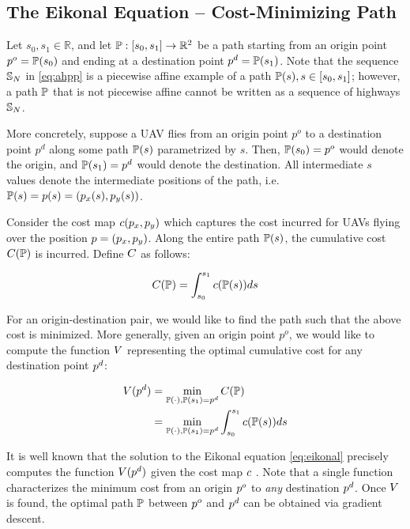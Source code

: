 \subsection{The Eikonal Equation -- Cost-Minimizing Path}
Let $s_0, s_1\in \mathbb{R}$, and let $\mathbb{P}: [s_0, s_1] \rightarrow \mathbb{R}^2$ be a path starting from an origin point $p^o = \mathbb{P}(s_0)$ and ending at a destination point $p^d = \mathbb{P}(s_1)$. Note that the sequence $\mathbb{S}_N$ in \eqref{eq:ahpp} is a piecewise affine example of a path $\mathbb{P}(s), s\in[s_0, s_1]$; however, a path $\mathbb{P}$ that is not piecewise affine cannot be written as a sequence of highways $\mathbb{S}_N$.

More concretely, suppose a UAV flies from an origin point $p^o$ to a destination point $p^d$ along some path $\mathbb{P}(s)$ parametrized by $s$. Then, $\mathbb{P}(s_0) = p^o$ would denote the origin, and $\mathbb{P}(s_1) = p^d$ would denote the destination. All intermediate $s$ values denote the intermediate positions of the path, i.e. $\mathbb{P}(s) = p(s) = (p_x(s), p_y(s))$.

Consider the cost map $c(p_x, p_y)$ which captures the cost incurred for UAVs flying over the position $p = (p_x, p_y)$. Along the entire path $\mathbb{P}(s)$, the cumulative cost $C(\mathbb{P})$ is incurred. Define $C$ as follows:

\begin{equation}
C(\mathbb{P}) = \int_{s_0}^{s_1} c(\mathbb{P}(s)) ds
\end{equation}

For an origin-destination pair, we would like to find the path such that the above cost is minimized. More generally, given an origin point $p^o$, we would like to compute the function $V$ representing the optimal cumulative cost for any destination point $p^d$:

\begin{equation}
\label{eq:rahpp} %
\begin{aligned}
\ocost(\pos^d) &= \min_{\ppath(\cdot), \ppath(s_1)=\pos^d} \ccost(\ppath) \\
&= \min_{\ppath(\cdot), \ppath(s_1)=\pos^d} \int_{s_0}^{s_1} \cmap(\ppath(s)) ds
\end{aligned}
\end{equation}

It is well known that the solution to the Eikonal equation \eqref{eq:eikonal} precisely computes the function $V(p^d)$ given the cost map $c$ \cite{Sethian96,Alton06}. Note that a single function characterizes the minimum cost from an origin $p^o$ to \textit{any} destination $p^d$. Once $V$ is found, the optimal path $\mathbb{P}$ between $p^o$ and $p^d$ can be obtained via gradient descent.

